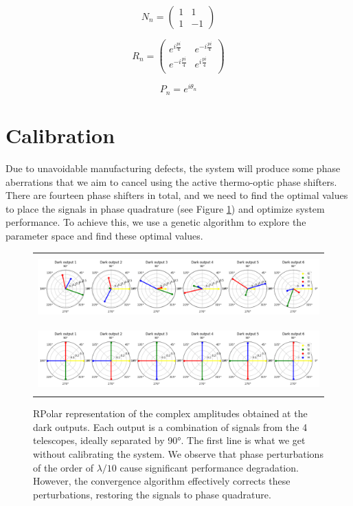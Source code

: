 \documentclass[]{spie}  %
\begin{document}
\begin{equation}\label{N}
    N_n =
    \begin{pmatrix}
        1 & 1 \\
        1 & -1
    \end{pmatrix}
\end{equation}

\begin{equation}\label{R}
    R_n =
    \begin{pmatrix}
        e^{i\frac{pi}{4}} & e^{-i\frac{pi}{4}} \\
        e^{-i\frac{pi}{4}} & e^{i\frac{pi}{4}} \\
    \end{pmatrix}
\end{equation}

\begin{equation}\label{P}
    P_n = e^{i\theta_n}
\end{equation}

\section{Calibration}

Due to unavoidable manufacturing defects, the system will produce some phase aberrations that we aim to cancel using the active thermo-optic phase shifters. There are fourteen phase shifters in total, and we need to find the optimal values to place the signals in phase quadrature (see Figure \ref{fig:phases}) and optimize system performance. To achieve this, we use a genetic algorithm to explore the parameter space and find these optimal values.

\begin{figure} [ht]
    \begin{center}
    \begin{tabular}{c}
    \includegraphics[height=2.5cm]{img/perturbed_phase.png}\\
    \includegraphics[height=2.5cm]{img/calibrated_phase.png}
    \end{tabular}
    \end{center}
    \caption[phases] 
    { \label{fig:phases} 
    RPolar representation of the complex amplitudes obtained at the dark outputs. Each output is a combination of signals from the 4 telescopes, ideally separated by 90°. The first line is what we get without calibrating the system. We observe that phase perturbations of the order of $\lambda / 10$ cause significant performance degradation. However, the convergence algorithm effectively corrects these perturbations, restoring the signals to phase quadrature.}
\end{figure}
\end{document}
